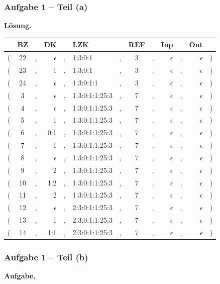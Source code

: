 \documentclass{beamer}
\newcommand*\head{\rowfont{\bfseries}}
\begin{document}
\begin{frame} \frametitle{Aufgabe 1 -- Teil (a)}
	\footnotesize
	\textbf{Lösung.}
	
	\scriptsize
	\begin{center}
		\begin{tabu}{rccrclcccrcrl}
			\head & BZ && DK && LZK && REF && Inp && Out & \\ \hline 
			( & 22 &,& $\epsilon$ &,& 1:3:0:1 &,& 3 &,& $\epsilon$ &,& $\epsilon$ & ) \\
			( & 23 &,& 1 &,& 1:3:0:1 &,& 3 &,& $\epsilon$ &,& $\epsilon$ & ) \\
			( & 24 &,& $\epsilon$ &,& 1:3:0:1:1 &,& 3 &,& $\epsilon$ &,& $\epsilon$ & ) \\
			( & 3 &,& $\epsilon$ &,& 1:3:0:1:1:25:3 &,& 7 &,& $\epsilon$ &,& $\epsilon$ & ) \\
			( & 4 &,& $\epsilon$ &,& 1:3:0:1:1:25:3 &,& 7 &,& $\epsilon$ &,& $\epsilon$ & ) \\
			( & 5 &,& 1 &,& 1:3:0:1:1:25:3 &,& 7 &,& $\epsilon$ &,& $\epsilon$ & ) \\
			( & 6 &,& 0:1 &,& 1:3:0:1:1:25:3 &,& 7 &,& $\epsilon$ &,& $\epsilon$ & ) \\
			( & 7 &,& 1 &,& 1:3:0:1:1:25:3 &,& 7 &,& $\epsilon$ &,& $\epsilon$ & ) \\
			( & 8 &,& $\epsilon$ &,& 1:3:0:1:1:25:3 &,& 7 &,& $\epsilon$ &,& $\epsilon$ & ) \\
			( & 9 &,& 2 &,& 1:3:0:1:1:25:3 &,& 7 &,& $\epsilon$ &,& $\epsilon$ & ) \\
			( & 10 &,& 1:2 &,& 1:3:0:1:1:25:3 &,& 7 &,& $\epsilon$ &,& $\epsilon$ & ) \\
			( & 11 &,& 2 &,& 1:3:0:1:1:25:3 &,& 7 &,& $\epsilon$ &,& $\epsilon$ & ) \\
			( & 12 &,& $\epsilon$ &,& 2:3:0:1:1:25:3 &,& 7 &,& $\epsilon$ &,& $\epsilon$ & ) \\
			\hline
			( & 13 &,& 1 &,& 2:3:0:1:1:25:3 &,& 7 &,& $\epsilon$ &,& $\epsilon$ & ) \\
			( & 14 &,& 1:1 &,& 2:3:0:1:1:25:3 &,& 7 &,& $\epsilon$ &,& $\epsilon$ & ) \\
		\end{tabu}
	\end{center}
\end{frame}


\begin{frame}[fragile] \frametitle{Aufgabe 1 -- Teil (b)}
	\footnotesize
	\textbf{Aufgabe.}
	

	
\end{frame}
\end{document}
